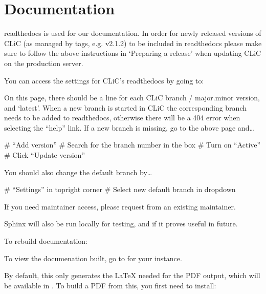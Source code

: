 \documentclass[letterpaper,10pt,english]{sphinxmanual}
\begin{document}
\section{Documentation}
\label{\detokenize{advanced/development:documentation}}
\sphinxAtStartPar
readthedocs is used for our documentation. In order for newly released versions of CLiC (as managed by tags, e.g. v2.1.2) to be included in readthedocs please make sure to follow the above instructions in ‘Preparing a release’ when updating CLiC on the production server.

\sphinxAtStartPar
You can access the settings for CLiC’s readthedocs by going to: 

\sphinxAtStartPar
On this page, there should be a line for each CLiC branch / major.minor version, and ‘latest’. When a new branch is started in CLiC the corresponding branch needs to be added to readthedocs, otherwise there will be a 404 error when selecting the “help” link. If a new branch is missing, go to the above page and…

\sphinxAtStartPar
\# “Add version”
\# Search for the branch number in the box
\# Turn on “Active”
\# Click “Update version”

\sphinxAtStartPar
You should also change the default branch by…

\sphinxAtStartPar
\# “Settings” in top\sphinxhyphen{}right corner
\# Select new default branch in drop\sphinxhyphen{}down

\sphinxAtStartPar
If you need maintainer access, please request from an existing maintainer.

\sphinxAtStartPar
Sphinx will also be run locally for testing, and if it proves useful in future.

\sphinxAtStartPar
To re\sphinxhyphen{}build documentation:

\begin{sphinxVerbatim}[commandchars=\\\{\}]
  
\end{sphinxVerbatim}

\sphinxAtStartPar
To view the documenation built, go to  for your instance.

\sphinxAtStartPar
By default, this only generates the LaTeX needed for the PDF output, which will
be available in . To build a PDF from
this, you first need to install:
\end{document}
